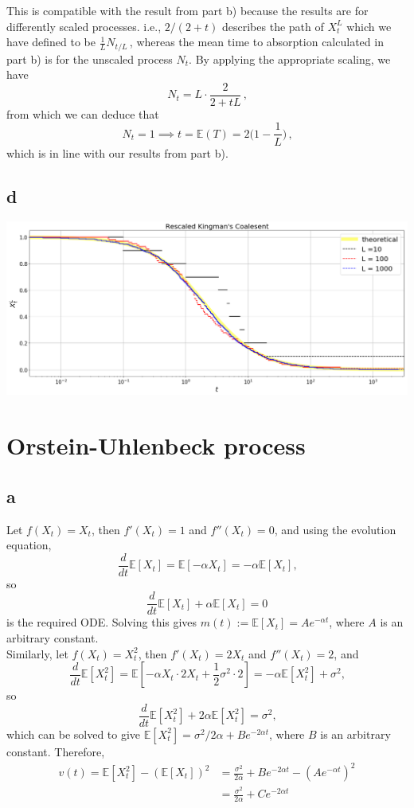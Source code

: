 \documentclass[12pt, twoside, a4paper]{article}
\begin{document}
This is compatible with the result from part b) because the results are for differently scaled processes. i.e., $2/(2+t)$ describes the path of $X_t^L$ which we have defined to be $\frac{1}{L} N_{t/L} \, $, whereas the mean time to absorption calculated in part b) is for the unscaled process $N_t$. By applying the appropriate scaling, we have 
\[
N_t = L \cdot \frac{2}{2+tL} \, \text{,}
\]
from which we can deduce that 
\[N_t = 1 \implies t = \mathbb{E} (T) = 2 \bigg(1 - \frac{1}{L} \bigg) \, \text{,}
\]
which is in line with our results from part b).

\subsection*{d}
\includegraphics[width=17cm]{Kingman}

\section{Orstein-Uhlenbeck process}
\subsection*{a}
Let $f(X_t) = X_t$, then $f'(X_t) = 1$ and $f''(X_t) = 0$, and using the evolution equation, 
\[
\frac{d}{dt} \mathbb{E} [X_t] = \mathbb{E} [ - \alpha X_t ] = - \alpha \mathbb{E} [X_t] \text{,}
\]
so
\[
\frac{d}{dt} \mathbb{E} [X_t] + \alpha \mathbb{E} [X_t] = 0
\]
is the required ODE. 
Solving this gives $m(t) := \mathbb{E} [X_t] = Ae^{- \alpha t}$, where $A$ is an arbitrary constant.\\
Similarly, let $f(X_t) = X_t^2$, then $f'(X_t) = 2X_t$ and $f''(X_t) = 2$, and 
\[
\frac{d}{dt} \mathbb{E} [X_t^2] = \mathbb{E} [ - \alpha X_t \cdot 2X_t + \frac{1}{2} \sigma ^2 \cdot 2 ] = - \alpha \mathbb{E} [X_t^2] + \sigma ^2 \text{,}
\]
so
\[
\frac{d}{dt} \mathbb{E} [X_t^2] + 2 \alpha \mathbb{E} [X_t^2] = \sigma ^2 \text{,}
\]
which can be solved to give $\mathbb{E} [X_t^2] = \sigma ^2/2 \alpha + Be^{-2 \alpha t}$, where $B$ is an arbitrary constant. Therefore, 
\begin{align*}
v(t) = \mathbb{E} [X_t^2] - (\mathbb{E} [X_t])^2 &= \frac{\sigma ^2}{2 \alpha} + Be^{-2 \alpha t} - (Ae^{- \alpha t})^2\\
&= \frac{\sigma ^2}{2 \alpha} + Ce^{-2 \alpha t}
\end{align*}
\end{document}
